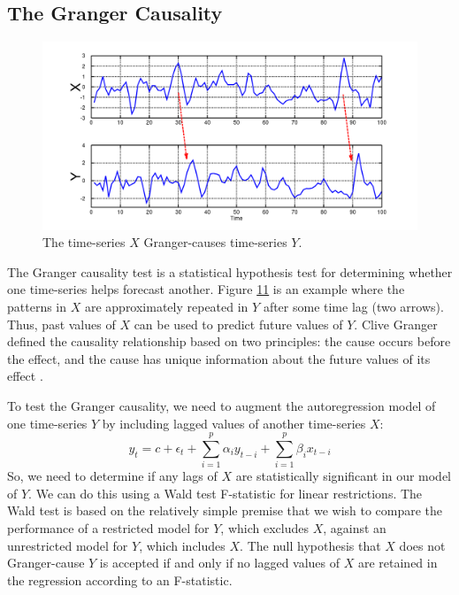 \subsection{The Granger Causality}
\begin{figure}[ht]
\centering
    \label{fig:granger}
    \includegraphics[width=\textwidth]{figures/granger.png}
    \caption{The time-series $X$ Granger-causes time-series $Y$.}
\end{figure}

The Granger causality test is a statistical hypothesis test for determining whether one time-series helps forecast another. Figure \hyperref[fig:fb-example]{11} is an example where the patterns in $X$ are approximately repeated in $Y$ after some time lag (two arrows). Thus, past values of $X$ can be used to predict future values of $Y$. Clive Granger defined the causality relationship based on two principles: the cause occurs before the effect, and the cause has unique information about the future values of its effect \cite{granger1980testing}.\newline

To test the Granger causality, we need to augment the autoregression model of one time-series $Y$ by including lagged values of another time-series $X$: 
\begin{equation}
y_{t}=c+\epsilon_{t}+\sum_{i=1}^{p} \alpha_{i} y_{t-i}+\sum_{i=1}^{p} \beta_{i} x_{t-i}
\end{equation}
So, we need to determine if any lags of $X$ are statistically significant in our model of $Y$. We can do this using a Wald test F-statistic for linear restrictions. The Wald test is based on the relatively simple premise that we wish to compare the performance of a restricted model for $Y$, which excludes $X$, against an unrestricted model for $Y$, which includes $X$. The null hypothesis that $X$ does not Granger-cause $Y$ is accepted if and only if no lagged values of $X$ are retained in the regression according to an F-statistic.\newline

